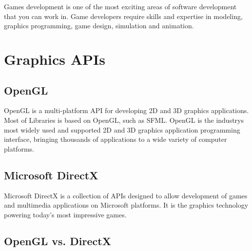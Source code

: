 Games development is one of the most exciting areas of software development that you can work in. Game developers require skills and expertise in modeling, graphics programming, game design, simulation and animation.\hypertarget{_game_development_GameDevelopmentGraphicsAPIs}{}\section{Graphics A\+P\+Is}\label{_game_development_GameDevelopmentGraphicsAPIs}
\hypertarget{_game_development_GameDevelopmentGraphicsAPIsOpenGL}{}\subsection{Open\+G\+L}\label{_game_development_GameDevelopmentGraphicsAPIsOpenGL}
Open\+G\+L is a multi-\/platform A\+P\+I for developing 2\+D and 3\+D graphics applications. Most of Libraries is based on Open\+G\+L, such as S\+F\+M\+L. Open\+G\+L is the industry\textquotesingle{}s most widely used and supported 2\+D and 3\+D graphics application programming interface, bringing thousands of applications to a wide variety of computer platforms. \cite{opengl}\hypertarget{_game_development_GameDevelopmentGraphicsAPIsMicrosoftDirectX}{}\subsection{Microsoft Direct\+X}\label{_game_development_GameDevelopmentGraphicsAPIsMicrosoftDirectX}
Microsoft Direct\+X is a collection of A\+P\+Is designed to allow development of games and multimedia applications on Microsoft platforms. It is the graphics technology powering today’s most impressive games.\hypertarget{_game_development_GameDevelopmentGraphicsAPIsComparison}{}\subsection{Open\+G\+L vs. Direct\+X}\label{_game_development_GameDevelopmentGraphicsAPIsComparison}
